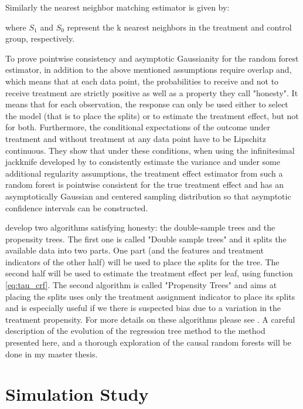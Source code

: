 \documentclass[11pt, a4paper, leqno]{article}
\begin{document}
Similarly the nearest neighbor matching estimator is given by: 

where \(S_1\) and \(S_0\) represent the k nearest neighbors in the treatment and control group, respectively.   

To prove pointwise consistency and asymptotic Gaussianity for the random forest estimator, in addition to the above mentioned assumptions \cite{wa18} require overlap and, which means that at each data point, the probabilities to receive and not to receive treatment are strictly positive as well as a property they call "honesty". It means that for each observation, the response can only be used either to select the model (that is to place the splits) or to estimate the treatment effect, but not for both. Furthermore, the conditional expectations of the outcome under treatment and without treatment at any data point have to be Lipschitz continuous.
They show that under these conditions, when using the infinitesimal jackknife developed by \cite{e14} to consistently estimate the variance and under some additional regularity assumptions, the treatment effect estimator from such a random forest is pointwise consistent for the true treatment effect and has an asymptotically Gaussian and centered sampling distribution so that asymptotic confidence intervals can be constructed. 

\cite{wa18} develop two algorithms satisfying honesty: the double-sample trees and the propensity trees. The first one is called "Double sample trees" and it splits the available data into two parts. One part (and the features and treatment indicators of the other half) will be used to place the splits for the tree. The second half will be used to estimate the treatment effect per leaf, using function \ref{eq:tau_crf}.
The second algorithm is called "Propensity Trees" and aims at placing the splits uses only the treatment assignment indicator to place its splits and is especially useful if we there is suspected bias due to a variation in the treatment propensity. For more details on these algorithms please see \cite[p.~1232]{wa18}. A careful description of the evolution of the regression tree method to the method presented here, and a thorough exploration of the causal random forests will be done in my master thesis.


\section{Simulation Study} %
\label{sec:simulation}
\end{document}
